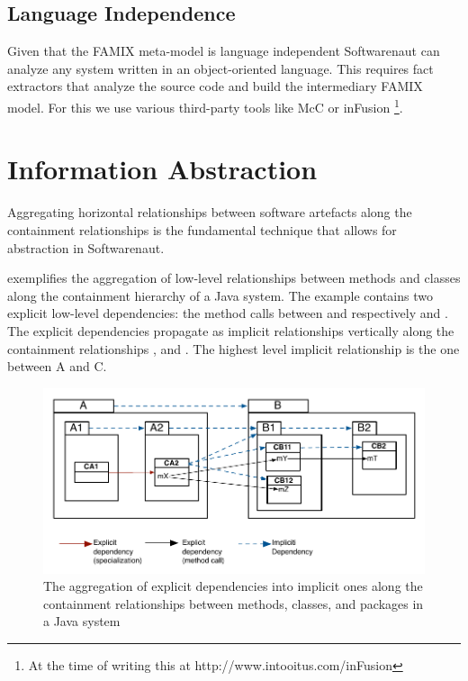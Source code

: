 \documentclass[preprint,12pt]{elsarticle}
\begin{document}
\subsection {Language Independence}
Given that the FAMIX meta-model is language independent Softwarenaut can analyze any system written in an object-oriented language. This requires fact extractors that analyze the source code and build the intermediary FAMIX model. For this we use various third-party tools like McC \cite{pepi-mcc} or inFusion \footnote{At the time of writing this at http://www.intooitus.com/inFusion}.


\newpage
\section {Information Abstraction}
\label{sec:org}

Aggregating horizontal relationships between software artefacts along the containment relationships is the fundamental technique that allows for abstraction in Softwarenaut. 

 exemplifies the aggregation 
of low-level relationships between methods and classes 
along the containment hierarchy 
of a Java system. The example contains two explicit low-level dependencies: 
the method calls between  and respectively  and . 
The explicit dependencies propagate as implicit relationships vertically along the containment relationships ,  and . The highest level implicit relationship is the one between A and C. 


\begin{figure}[h]
\begin{center}
\includegraphics[width=\linewidth]{images/DependencyAggregation}
\caption{The aggregation of explicit dependencies into implicit ones along the containment relationships between methods, classes, and packages in a Java system}
\end{center}
\end{figure}
\end{document}
